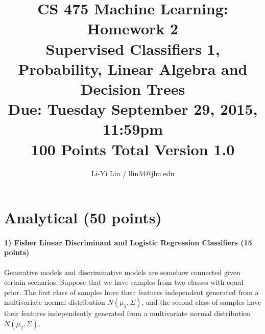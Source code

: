 \documentclass[11pt]{article}
\title{CS 475 Machine Learning: Homework 2\\Supervised Classifiers 1,\\
Probability, Linear Algebra and Decision Trees\\
\Large{Due: Tuesday September 29, 2015, 11:59pm}\\
100 Points Total \hspace{1cm} Version 1.0}
\author{Li-Yi Lin / llin34@jhu.edu}
\date{}
\begin{document}
\large
\maketitle
\thispagestyle{headings}

\vspace{-.5in}





\section{Analytical (50 points)}

\paragraph{1) Fisher Linear Discriminant and Logistic Regression Classifiers (15 points)}
Generative models and discriminative models are somehow connected given certain scenarios. Suppose that we have samples from two classes with equal prior. The first class of samples have their features independent generated from a multivariate normal distribution $N(\mu_1,\Sigma)$, and the second class of samples have their features independently generated from a multivariate normal distribution $N(\mu_2,\Sigma)$.
\end{document}
